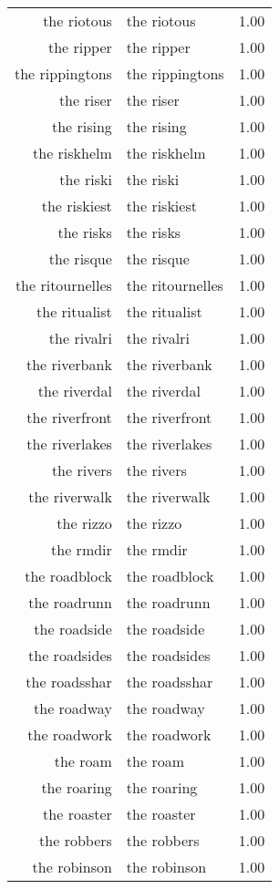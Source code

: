\begin{table}[ht]
\begin{tabular}{rlr}
  the riotous & the riotous & 1.00 \\ 
  the ripper & the ripper & 1.00 \\ 
  the rippingtons & the rippingtons & 1.00 \\ 
  the riser & the riser & 1.00 \\ 
  the rising & the rising & 1.00 \\ 
  the riskhelm & the riskhelm & 1.00 \\ 
  the riski & the riski & 1.00 \\ 
  the riskiest & the riskiest & 1.00 \\ 
  the risks & the risks & 1.00 \\ 
  the risque & the risque & 1.00 \\ 
  the ritournelles & the ritournelles & 1.00 \\ 
  the ritualist & the ritualist & 1.00 \\ 
  the rivalri & the rivalri & 1.00 \\ 
  the riverbank & the riverbank & 1.00 \\ 
  the riverdal & the riverdal & 1.00 \\ 
  the riverfront & the riverfront & 1.00 \\ 
  the riverlakes & the riverlakes & 1.00 \\ 
  the rivers & the rivers & 1.00 \\ 
  the riverwalk & the riverwalk & 1.00 \\ 
  the rizzo & the rizzo & 1.00 \\ 
  the rmdir & the rmdir & 1.00 \\ 
  the roadblock & the roadblock & 1.00 \\ 
  the roadrunn & the roadrunn & 1.00 \\ 
  the roadside & the roadside & 1.00 \\ 
  the roadsides & the roadsides & 1.00 \\ 
  the roadsshar & the roadsshar & 1.00 \\ 
  the roadway & the roadway & 1.00 \\ 
  the roadwork & the roadwork & 1.00 \\ 
  the roam & the roam & 1.00 \\ 
  the roaring & the roaring & 1.00 \\ 
  the roaster & the roaster & 1.00 \\ 
  the robbers & the robbers & 1.00 \\ 
  the robinson & the robinson & 1.00 \\ 

\end{tabular}
\end{table}
